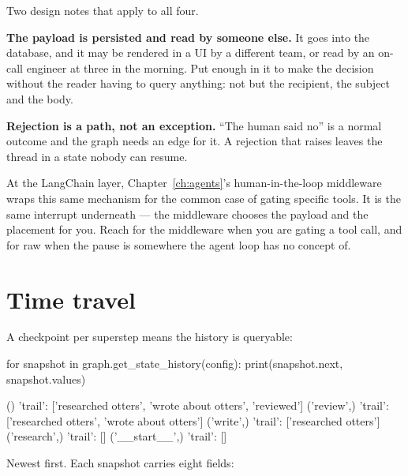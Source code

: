 Two design notes that apply to all four.

\textbf{The payload is persisted and read by someone else.} It goes into the
database, and it may be rendered in a UI by a different team, or read by an
on-call engineer at three in the morning. Put enough in it to make the decision
without the reader having to query anything: not 
but the recipient, the subject and the body.

\textbf{Rejection is a path, not an exception.} ``The human said no'' is a normal
outcome and the graph needs an edge for it. A rejection that raises leaves the
thread in a state nobody can resume.

\begin{note}
At the LangChain layer, Chapter~\ref{ch:agents}'s human-in-the-loop middleware
wraps this same mechanism for the common case of gating specific tools. It is the
same interrupt underneath --- the middleware chooses the payload and the
placement for you. Reach for the middleware when you are gating a tool call, and
for raw  when the pause is somewhere the agent loop has no concept
of.
\end{note}

\section{Time travel}
\label{sec:time-travel}

A checkpoint per superstep means the history is queryable:

\begin{python}[caption={Every state this thread has been in}, label={lst:history}]
for snapshot in graph.get_state_history(config):
    print(snapshot.next, snapshot.values)
\end{python}

\begin{console}
()             {'trail': ['researched otters', 'wrote about otters', 'reviewed']}
('review',)    {'trail': ['researched otters', 'wrote about otters']}
('write',)     {'trail': ['researched otters']}
('research',)  {'trail': []}
('__start__',) {'trail': []}
\end{console}

Newest first. Each snapshot carries eight fields:

